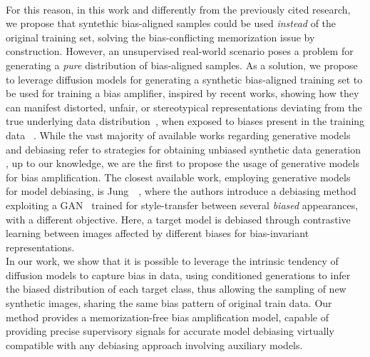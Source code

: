\\ For this reason, in this work and differently from the previously cited research, we propose that syntethic bias-aligned samples could be used \textit{instead} of the original training set, solving the bias-conflicting memorization issue by construction.
However, an unsupervised real-world scenario poses a problem for generating a \textit{pure} distribution of bias-aligned samples. As a solution, we propose to leverage diffusion models for generating a synthetic bias-aligned training set to be used for training a bias amplifier, inspired by   %
recent works, showing how they can manifest distorted, unfair, or stereotypical representations deviating from the true underlying data distribution~\cite{DBLP:journals/csur/MehrabiMSLG21}, when exposed to biases present in the training data ~\cite{DBLP:conf/icb/PereraP23}.
While the vast majority of available works regarding generative models and debiasing refer to strategies for obtaining unbiased synthetic data generation \cite{bhat2023debiasinggenerativemodelsusing, gerych2023debiasing}, up to our knowledge, we are the first to propose the usage of generative models for bias amplification.  The closest available work, employing generative models for model debiasing, is Jung~\etal~\cite{jung2023fighting}, where the authors introduce a debiasing method exploiting a GAN~\cite{10.1145/3422622}  trained for style-transfer between several \textit{biased} appearances, with a different objective. Here, a target model is debiased through contrastive learning between images affected by different biases for bias-invariant representations.\\ In our work, we show that it is possible to leverage the intrinsic tendency of diffusion models to capture bias in data, using conditioned generations to infer the biased distribution of each target class, thus allowing the sampling of new synthetic images, sharing the same bias pattern of original train data. 
Our method provides a memorization-free bias amplification model, capable of providing precise supervisory signals for accurate model debiasing virtually compatible with any debiasing approach involving auxiliary models. 
